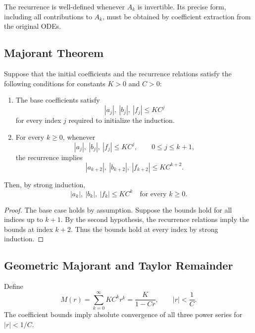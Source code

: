 \documentclass[11pt,letterpaper]{article}
\begin{document}
The recurrence is well-defined whenever \(A_k\) is invertible.
Its precise form, including all contributions to \(A_k\), must
be obtained by coefficient extraction from the original ODEs.

\subsection{Majorant Theorem}

Suppose that the initial coefficients and the recurrence
relations satisfy the following conditions for constants
\(K>0\) and \(C>0\):

\begin{enumerate}
    \item The base coefficients satisfy
    \[
    |a_j|,\ |b_j|,\ |f_j|\le KC^j
    \]
    for every index \(j\) required to initialize the induction.

    \item For every \(k\ge 0\), whenever
    \[
    |a_j|,\ |b_j|,\ |f_j|\le KC^j,
    \qquad 0\le j\le k+1,
    \]
    the recurrence implies
    \[
    |a_{k+2}|,\ |b_{k+2}|,\ |f_{k+2}|
    \le KC^{k+2}.
    \]
\end{enumerate}

Then, by strong induction,
\[
\boxed{
|a_k|,\ |b_k|,\ |f_k|\le KC^k
\quad\text{for every }k\ge0.
}
\]

\begin{proof}
The base case holds by assumption. Suppose the bounds hold
for all indices up to \(k+1\). By the second hypothesis,
the recurrence relations imply the bounds at index \(k+2\).
Thus the bounds hold at every index by strong induction.
\end{proof}

\subsection{Geometric Majorant and Taylor Remainder}

Define
\[
M(r)=\sum_{k=0}^{\infty}KC^k r^k
=\frac{K}{1-Cr},\qquad |r|<\frac1C.
\]
The coefficient bounds imply absolute convergence of all
three power series for \(|r|<1/C\).
\end{document}
